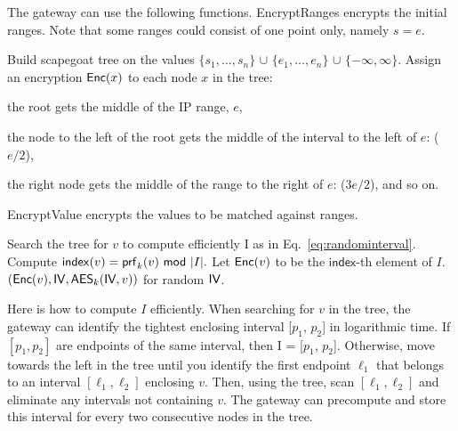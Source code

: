 The gateway can use the following functions. EncryptRanges encrypts the initial ranges. Note that some ranges could consist of
one point only, namely $s = e$. 


\begin{framed}
\begin{algorithmic}[1]

  \State Build scapegoat tree on the values 
              $\{s_1, \dots, s_n\}$ 
              $\cup$ $\{e_1, \dots, e_n\}$ 
              $\cup$ $\{-\infty, \infty\}$.
  \State Assign an encryption $\mathsf{Enc}(x)$ to each node $x$ in the tree:
  \begin{CompactItemize}
  \item the root gets the middle of the IP range, $e$, 
  \item the node to the left of the root gets the middle of the interval to the left of $e$: ($e/2$),
  \item the right node gets the middle of the range
  to the right of $e$: ($3e/2$), and so on.
  \end{CompactItemize}

  \State {}
\EndProcedure

\end{algorithmic}
\end{framed}



EncryptValue encrypts the values to be matched against ranges.

\begin{framed}
\begin{algorithmic}[1]

  \State Search the tree for $v$ to compute efficiently I as in Eq.~\ref{eq:randominterval}.
  \State Compute $\mathsf{index}(v) = \prf_k(v)\ \mod\ |I|.$ 
  \State Let $\mathsf{Enc}(v)$ to be the $\mathsf{index}$-th element of $I$. 
  \State \Return $\left(\mathsf{Enc}(v), \mathsf{IV}, \mathsf{AES}_k(\mathsf{IV}, v)\right)$ for random $\mathsf{IV}$. 
\EndProcedure

\end{algorithmic}
\end{framed}

Here is how to compute $I$ efficiently. When searching for $v$ in the tree, the gateway
can identify the tightest enclosing interval [$p_1$, $p_2$] in logarithmic time. 
 If $[p_1, p_2]$ are endpoints of the
same interval, then I = [$p_1$, $p_2$]. Otherwise, move towards the left in the tree until you identify the first endpoint
$\ell_1$
that belongs to an interval $[\ell_1, \ell_2]$ enclosing $v$. Then, using the tree, scan $[\ell_1, \ell_2]$ and eliminate
any intervals not containing $v$. The gateway can precompute and store this interval for every two consecutive nodes in the tree.

